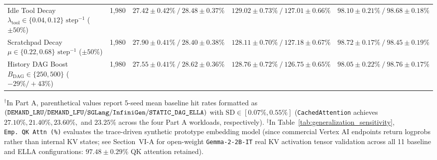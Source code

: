 \documentclass[conference,10pt]{IEEEtran}
\begin{document}
\begin{table}[t]
{\begin{tabular}{@{}lcccc@{}}
Idle Tool Decay $\lambda_{\text{tool}} \in \{0.04, 0.12\}\text{ step}^{-1}$ ($\pm 50\%$) & 1,980 & $27.42 \pm 0.42\%\ /\ 28.48 \pm 0.37\%$ & $129.02 \pm 0.73\%\ /\ 127.01 \pm 0.66\%$ & $98.10 \pm 0.21\%\ /\ 98.68 \pm 0.18\%$ \\
Scratchpad Decay $\mu \in \{0.22, 0.68\}\text{ step}^{-1}$ ($\pm 50\%$) & 1,980 & $27.90 \pm 0.41\%\ /\ 28.40 \pm 0.38\%$ & $128.11 \pm 0.70\%\ /\ 127.18 \pm 0.67\%$ & $98.72 \pm 0.17\%\ /\ 98.45 \pm 0.19\%$ \\
History DAG Boost $B_{\text{DAG}} \in \{250, 500\}$ ($-29\% / +43\%$) & 1,980 & $27.55 \pm 0.41\%\ /\ 28.62 \pm 0.36\%$ & $128.76 \pm 0.72\%\ /\ 126.75 \pm 0.65\%$ & $98.05 \pm 0.22\%\ /\ 98.76 \pm 0.17\%$ \\
\bottomrule
\end{tabular}%
}
\vspace{2pt}
\begin{minipage}{0.99\textwidth}
\footnotesize
$^\dagger$In Part A, parenthetical values report 5-seed mean baseline hit rates formatted as $(\texttt{DEMAND\_\allowbreak{}LRU} / \allowbreak\texttt{DEMAND\_\allowbreak{}LFU} / \allowbreak\texttt{SGLang} / \allowbreak\texttt{InfiniGen} / \allowbreak\texttt{STATIC\_\allowbreak{}DAG\_\allowbreak{}ELLA})$ with $\text{SD} \in [0.07\%, 0.55\%]$ (\texttt{Cached\allowbreak{}Attention} achieves $27.10\%, 21.40\%, 23.60\%,$ and $23.25\%$ across the four Part A workloads, respectively). $^\ddagger$In Table~\ref{tab:generalization_sensitivity}, \texttt{Emp.\ QK\allowbreak\ Attn (\%)} evaluates the trace-driven synthetic prototype embedding model (since commercial Vertex AI endpoints return logprobs rather than internal KV states; see Section~VI-A for open-weight \texttt{Gemma-2-2B-IT} real KV activation tensor validation across all 11 baseline and ELLA configurations: $97.48 \pm 0.29\%$ QK attention retained).
\end{minipage}
\end{table}
\end{document}
